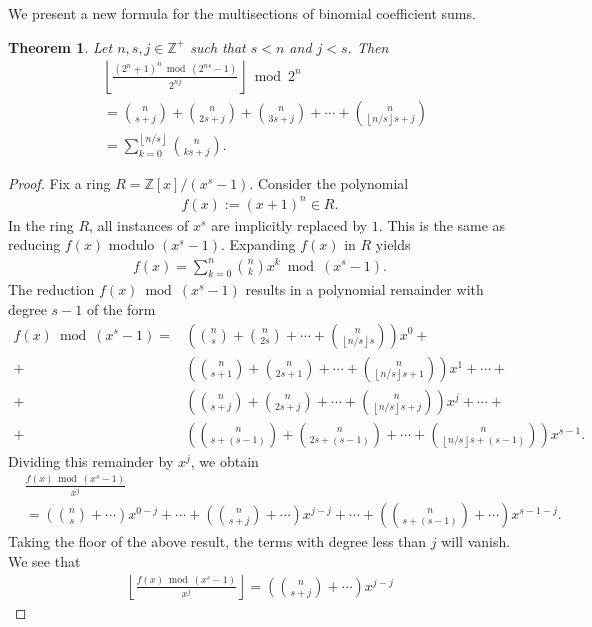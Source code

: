 \documentclass[10pt]{article}
\theoremstyle{plain}
\newtheorem{theorem}{Theorem}[section]
\newcommand{\floor}[1]{\left\lfloor #1 \right\rfloor}
\newcommand{\Z}{\mathbb{Z}}
\begin{document}
We present a new formula for the multisections of binomial coefficient sums.

\begin{theorem}
Let $n,s,j \in \Z^+$ such that $s < n$ and $j < s$. Then
\begin{align*}
& \floor{\frac{(2^n+1)^n \bmod (2^{ns}-1)}{2^{nj}}} \bmod 2^n \\
&= \binom{n}{s+j} + \binom{n}{2s+j} + \binom{n}{3s+j} + \cdots + \binom{n}{\floor{n/s}s+j} \\
&= \sum_{k=0}^{\floor{n/s}} \binom{n}{ks+j} .
\end{align*}
\end{theorem}
\begin{proof}
Fix a ring $R = \Z[x]/(x^s-1)$. Consider the polynomial
\begin{align*}
f(x) := (x+1)^n \in R .
\end{align*}
In the ring $R$, all instances of $x^s$ are implicitly replaced by $1$. This is the same as reducing $f(x)$ modulo $(x^s-1)$. Expanding $f(x)$ in $R$ yields
\begin{align*}
f(x) = \sum_{k=0}^n \binom{n}{k} x^k \bmod(x^s-1) .
\end{align*}
The reduction $f(x) \bmod (x^s-1)$ results in a polynomial remainder with degree $s-1$ of the form
\begin{align*}
f(x) \bmod (x^s-1) = & \left(\binom{n}{s} + \binom{n}{2s} + \cdots + \binom{n}{\floor{n/s}s} \right) x^0 + \\
+ & \left(\binom{n}{s+1} + \binom{n}{2s+1} + \cdots + \binom{n}{\floor{n/s}s+1} \right) x^1 + \cdots + \\
+ & \left(\binom{n}{s+j} + \binom{n}{2s+j} + \cdots + \binom{n}{\floor{n/s}s+j} \right) x^j
+ \cdots + \\
+ & \left(\binom{n}{s+(s-1)} + \binom{n}{2s+(s-1)} + \cdots + \binom{n}{\floor{n/s}s+(s-1)} \right) x^{s-1} .
\end{align*}
Dividing this remainder by $x^j$, we obtain
\begin{align*}
& \frac{f(x) \bmod(x^s-1)}{x^j} \\
&= \left(\binom{n}{s} + \cdots \right) x^{0-j}
+ \cdots
+ \left(\binom{n}{s+j} + \cdots \right) x^{j-j}
+ \cdots
+ \left(\binom{n}{s+(s-1)} + \cdots \right) x^{s-1-j} .
\end{align*}
Taking the floor of the above result, the terms with degree less than $j$ will vanish. We see that
\begin{align*}
\floor{\frac{f(x) \bmod(x^s-1)}{x^j}}
= \left(\binom{n}{s+j} + \cdots \right) x^{j-j}

\end{align*}
\end{proof}
\end{document}
